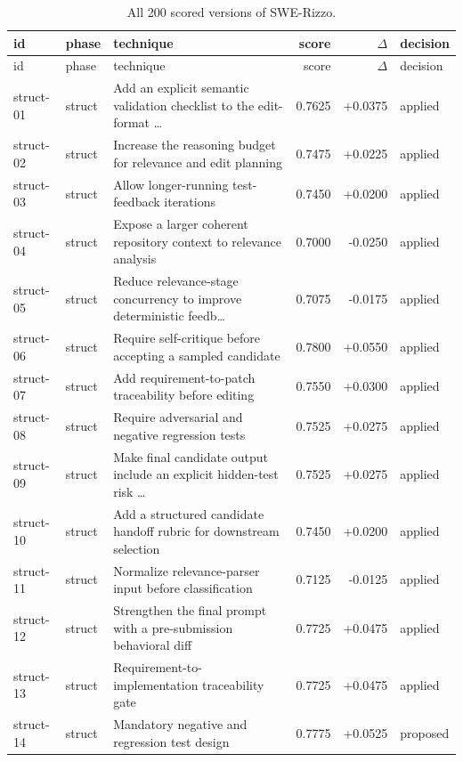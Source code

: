 \begin{center}\scriptsize\begin{longtable}{llp{5.2cm}rrl}
\caption{All 200 scored versions of SWE-Rizzo.}\\
\toprule id & phase & technique & score & $\Delta$ & decision \\ \midrule \endfirsthead
\toprule id & phase & technique & score & $\Delta$ & decision \\ \midrule \endhead
struct-01 & struct & Add an explicit semantic validation checklist to the edit-format \ldots{} & 0.7625 & +0.0375 & applied \\
struct-02 & struct & Increase the reasoning budget for relevance and edit planning & 0.7475 & +0.0225 & applied \\
struct-03 & struct & Allow longer-running test-feedback iterations & 0.7450 & +0.0200 & applied \\
struct-04 & struct & Expose a larger coherent repository context to relevance analysis & 0.7000 & -0.0250 & applied \\
struct-05 & struct & Reduce relevance-stage concurrency to improve deterministic feedb\ldots{} & 0.7075 & -0.0175 & applied \\
struct-06 & struct & Require self-critique before accepting a sampled candidate & 0.7800 & +0.0550 & applied \\
struct-07 & struct & Add requirement-to-patch traceability before editing & 0.7550 & +0.0300 & applied \\
struct-08 & struct & Require adversarial and negative regression tests & 0.7525 & +0.0275 & applied \\
struct-09 & struct & Make final candidate output include an explicit hidden-test risk \ldots{} & 0.7525 & +0.0275 & applied \\
struct-10 & struct & Add a structured candidate handoff rubric for downstream selection & 0.7450 & +0.0200 & applied \\
struct-11 & struct & Normalize relevance-parser input before classification & 0.7125 & -0.0125 & applied \\
struct-12 & struct & Strengthen the final prompt with a pre-submission behavioral diff & 0.7725 & +0.0475 & applied \\
struct-13 & struct & Requirement-to-implementation traceability gate & 0.7725 & +0.0475 & applied \\
struct-14 & struct & Mandatory negative and regression test design & 0.7775 & +0.0525 & proposed \\

\end{longtable}
\end{center}
